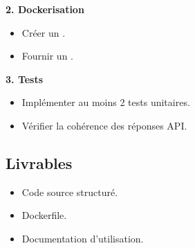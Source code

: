\documentclass[11pt,a4paper]{article}
\begin{document}
\textbf{2. Dockerisation}

\begin{itemize}
  \item Créer un .
  \item Fournir un .
\end{itemize}

\textbf{3. Tests}

\begin{itemize}
  \item Implémenter au moins 2 tests unitaires.
  \item Vérifier la cohérence des réponses API.
\end{itemize}

\subsection*{Livrables}

\begin{itemize}
  \item Code source structuré.
  \item Dockerfile.
  \item Documentation d’utilisation.
\end{itemize}
\end{document}
